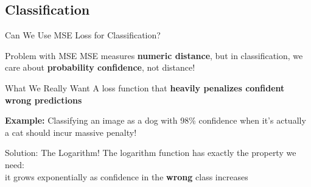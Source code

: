 \subsection{Classification}

\begin{frame}{Can We Use MSE Loss for Classification?}
    \begin{alertblock}{Problem with MSE}
        MSE measures \textbf{numeric distance}, but in classification, we care about \textbf{probability confidence}, not distance!
    \end{alertblock}
    
    \vspace{1em}
    
    \begin{alertblock}{What We Really Want}
        A loss function that \textbf{heavily penalizes confident wrong predictions}
        
        \vspace{0.5em}
        \textbf{Example:} Classifying an image as a dog with 98\% confidence when it's actually a cat should incur massive penalty!
    \end{alertblock}
    
    \vspace{1.5em}
    
    \begin{block}{Solution: The Logarithm!}
        The logarithm function has exactly the property we need:\\
        it grows exponentially as confidence in the \textbf{wrong} class increases
    \end{block}
\end{frame}

